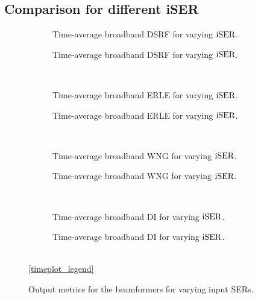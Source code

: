 \subsection{Comparison for different iSER}
\begin{figure}[H]
	\centering
	\begin{subfigure}{0.48\textwidth}
		\centering
		
		\caption{Time-average broadband DSRF for varying $\text{iSER}$.}
		\label{subfig:lineplot__DSRF__iSER_var__Ly_1}
	\end{subfigure}\hfill
	\begin{subfigure}{0.48\textwidth}
		\centering
		
		\caption{Time-average broadband DSRF for varying $\text{iSER}$.}
		\label{subfig:lineplot__DSRF__iSER_var__Ly_16}
	\end{subfigure}\\[1em]
	\begin{subfigure}{0.48\textwidth}
		\centering
		
		\caption{Time-average broadband ERLE for varying $\text{iSER}$.}
		\label{subfig:lineplot__ERLE__iSER_var__Ly_1}
	\end{subfigure}\hfill
	\begin{subfigure}{0.48\textwidth}
		\centering
		
		\caption{Time-average broadband ERLE for varying $\text{iSER}$.}
		\label{subfig:lineplot__ERLE__iSER_var__Ly_16}
	\end{subfigure}\\[1em]
	\begin{subfigure}{0.48\textwidth}
		\centering
		
		\caption{Time-average broadband WNG for varying $\text{iSER}$.}
		\label{subfig:lineplot__WNG__iSER_var__Ly_1}
	\end{subfigure}\hfill
	\begin{subfigure}{0.48\textwidth}
		\centering
		
		\caption{Time-average broadband WNG for varying $\text{iSER}$.}
		\label{subfig:lineplot__WNG__iSER_var__Ly_16}
	\end{subfigure}\\[1em]
	\begin{subfigure}{0.48\textwidth}
		\centering
		
		\caption{Time-average broadband DI for varying $\text{iSER}$.}
		\label{subfig:lineplot__DI__iSER_var__Ly_1}
	\end{subfigure}\hfill
	\begin{subfigure}{0.48\textwidth}
		\centering
		
		\caption{Time-average broadband DI for varying $\text{iSER}$.}
		\label{subfig:lineplot__DI__iSER_var__Ly_16}
	\end{subfigure}\\[1em]
	\ref*{timeplot_legend}
	\caption{Output metrics for the beamformers for varying input SERs.}
	\label{fig:lineplot__iSER_var__Ly_1}
\end{figure}

